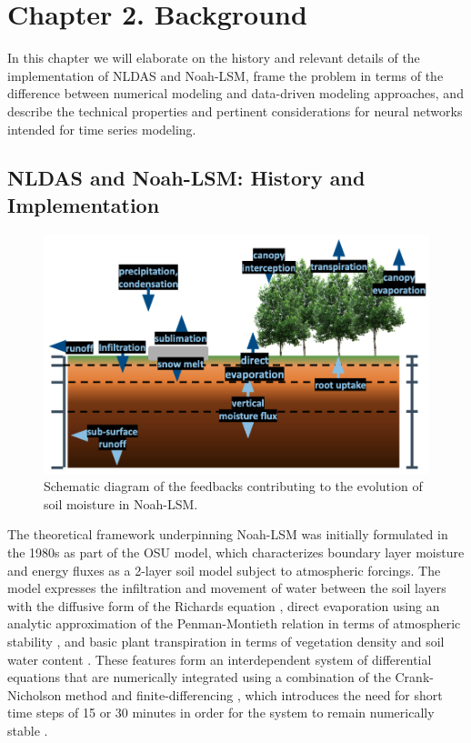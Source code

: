 \chapter{Chapter 2. Background}

In this chapter we will elaborate on the history and relevant details of the implementation of NLDAS and Noah-LSM, frame the problem in terms of the difference between numerical modeling and data-driven modeling approaches, and describe the technical properties and pertinent considerations for neural networks intended for time series modeling.

\section{NLDAS and Noah-LSM: History and Implementation}

\begin{figure}[h]
    \centering

    \includegraphics[width=.66\linewidth]{figures/schematic_noah-overview.png}

    \caption{Schematic diagram of the feedbacks contributing to the evolution of soil moisture in Noah-LSM.}
    \label{noah-schematic}
\end{figure}

The theoretical framework underpinning Noah-LSM was initially formulated in the 1980s as part of the OSU model, which characterizes boundary layer moisture and energy fluxes as a 2-layer soil model subject to atmospheric forcings. The model expresses the infiltration and movement of water between the soil layers with the diffusive form of the Richards equation \parencite{mahrt_two-layer_1984}, direct evaporation using an analytic approximation of the Penman-Montieth relation in terms of atmospheric stability \parencite{mahrt_influence_1984}, and basic plant transpiration in terms of vegetation density and soil water content \parencite{pan_interaction_1987}. These features form an interdependent system of differential equations that are numerically integrated using a combination of the Crank-Nicholson method and finite-differencing \parencite{chen_impact_1997}, which introduces the need for short time steps of 15 or 30 minutes in order for the system to remain numerically stable \parencite{cartwright_dynamics_1992} \parencite{mahrt_two-layer_1984}.

